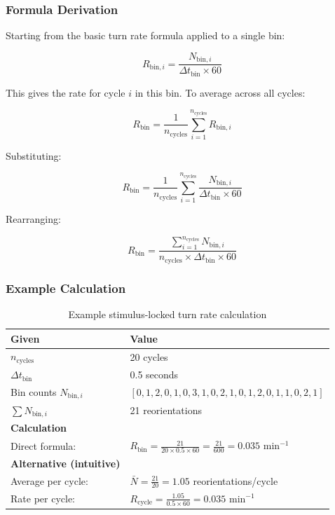\documentclass[
  11pt,
]{article}
\begin{document}
\hypertarget{formula-derivation-1}{%
\subsubsection{Formula Derivation}\label{formula-derivation-1}}

Starting from the basic turn rate formula applied to a single bin:

\[R_{\text{bin},i} = \frac{N_{\text{bin},i}}{\Delta t_{\text{bin}} \times 60}\]

This gives the rate for cycle \(i\) in this bin. To average across all
cycles:

\[R_{\text{bin}} = \frac{1}{n_{\text{cycles}}} \sum_{i=1}^{n_{\text{cycles}}} R_{\text{bin},i}\]

Substituting:

\[R_{\text{bin}} = \frac{1}{n_{\text{cycles}}} \sum_{i=1}^{n_{\text{cycles}}} \frac{N_{\text{bin},i}}{\Delta t_{\text{bin}} \times 60}\]

Rearranging:

\[R_{\text{bin}} = \frac{\sum_{i=1}^{n_{\text{cycles}}} N_{\text{bin},i}}{n_{\text{cycles}} \times \Delta t_{\text{bin}} \times 60}\]

\hypertarget{example-calculation-1}{%
\subsubsection{Example Calculation}\label{example-calculation-1}}

\begin{table}[H]
\centering
\small
\begin{tabular}{ll}
\hline
\textbf{Given} & \textbf{Value} \\
\hline
$n_{\text{cycles}}$ & 20 cycles \\
$\Delta t_{\text{bin}}$ & 0.5 seconds \\
Bin counts $N_{\text{bin},i}$ & $[0, 1, 2, 0, 1, 0, 3, 1, 0, 2, 1, 0, 1, 2, 0, 1, 1, 0, 2, 1]$ \\
$\sum N_{\text{bin},i}$ & 21 reorientations \\
\hline
\textbf{Calculation} & \\
\hline
Direct formula: & $R_{\text{bin}} = \frac{21}{20 \times 0.5 \times 60} = \frac{21}{600} = 0.035 \text{ min}^{-1}$ \\
\hline
\textbf{Alternative (intuitive)} & \\
\hline
Average per cycle: & $\bar{N} = \frac{21}{20} = 1.05$ reorientations/cycle \\
Rate per cycle: & $R_{\text{cycle}} = \frac{1.05}{0.5 \times 60} = 0.035 \text{ min}^{-1}$ \\
\hline
\end{tabular}
\caption{Example stimulus-locked turn rate calculation}

\end{table}
\end{document}
